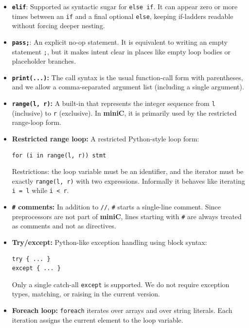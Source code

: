 \documentclass[11pt]{article}
\newcommand{\lang}{\textbf{miniC}}
\begin{document}
\begin{itemize}
	\item \textbf{\texttt{elif}}: Supported as syntactic sugar for \texttt{else if}. It can appear zero or more times between an \texttt{if} and a final optional \texttt{else}, keeping if-ladders readable without forcing deeper nesting.

	\item \textbf{\texttt{pass;}}: An explicit no-op statement. It is equivalent to writing an empty statement \texttt{;}, but it makes intent clear in places like empty loop bodies or placeholder branches.

	\item \textbf{\texttt{print(...)}:} The call syntax is the usual function-call form with parentheses, and we allow a comma-separated argument list (including a single argument).

	\item \textbf{\texttt{range(l, r)}:} A built-in that represents the integer sequence from \texttt{l} (inclusive) to \texttt{r} (exclusive). In \lang{}, it is primarily used by the restricted range-loop form.

	\item \textbf{Restricted range loop:} A restricted Python-style loop form:
	\begin{lstlisting}
for (i in range(l, r)) stmt
	\end{lstlisting}
	Restrictions: the loop variable must be an identifier, and the iterator must be exactly \texttt{range(l, r)} with two expressions. Informally it behaves like iterating \texttt{i = l} while \texttt{i < r}.

	\item \textbf{\texttt{\#} comments:} In addition to \texttt{//}, \texttt{\#} starts a single-line comment. Since preprocessors are not part of \lang{}, lines starting with \texttt{\#} are always treated as comments and not as directives.

	\item \textbf{Try/except:} Python-like exception handling using block syntax:
	\begin{lstlisting}
try { ... } 
except { ... }
	\end{lstlisting}
	Only a single catch-all \texttt{except} is supported. We do not require exception types, matching, or raising in the current version.

	\item \textbf{Foreach loop:} \texttt{foreach} iterates over arrays and over string literals. Each iteration assigns the current element to the loop variable.


\end{itemize}
\end{document}
